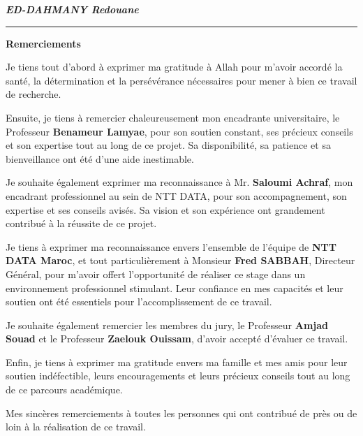 \documentclass[12pt, a4paper, openany]{report}
\begin{document}
\vspace{0.6cm}

\begin{flushright}
    {\fontsize{14}{16}\selectfont\textit{\textbf{ED-DAHMANY Redouane}}}
\end{flushright}

\vspace{0.1cm}


\newpage
\thispagestyle{frontmatter} 
{} 

\vspace*{0.5cm} 



\noindent
\textcolor{royalBlue}{\rule{0.55\textwidth}{1pt}}
\hfill
{\fontsize{24}{28}\selectfont\color{royalBlue}\bfseries Remerciements}

\vspace{0.0cm}


\begin{large}
\itshape
\setlength{\parskip}{0.3cm} 
\renewcommand{\baselinestretch}{1.3}\selectfont 

Je tiens tout d'abord à exprimer ma gratitude à Allah pour m'avoir accordé la santé, la détermination et la persévérance nécessaires pour mener à bien ce travail de recherche.

Ensuite, je tiens à remercier chaleureusement mon encadrante universitaire, le Professeur \textbf{Benameur Lamyae}, pour son soutien constant, ses précieux conseils et son expertise tout au long de ce projet. Sa disponibilité, sa patience et sa bienveillance ont été d'une aide inestimable.

Je souhaite également exprimer ma reconnaissance à Mr. \textbf{Saloumi Achraf}, mon encadrant professionnel au sein de NTT DATA, pour son accompagnement, son expertise et ses conseils avisés. Sa vision et son expérience ont grandement contribué à la réussite de ce projet.

Je tiens à exprimer ma reconnaissance envers l'ensemble de l'équipe de \textbf{NTT DATA Maroc}, et tout particulièrement à Monsieur \textbf{Fred SABBAH}, Directeur Général, pour m'avoir offert l'opportunité de réaliser ce stage dans un environnement professionnel stimulant. Leur confiance en mes capacités et leur soutien ont été essentiels pour l'accomplissement de ce travail.

Je souhaite également remercier les membres du jury, le Professeur \textbf{Amjad Souad} et le Professeur \textbf{Zaelouk Ouissam}, d'avoir accepté d'évaluer ce travail.

Enfin, je tiens à exprimer ma gratitude envers ma famille et mes amis pour leur soutien indéfectible, leurs encouragements et leurs précieux conseils tout au long de ce parcours académique.

Mes sincères remerciements à toutes les personnes qui ont contribué de près ou de loin à la réalisation de ce travail.

\end{large}
\end{document}
